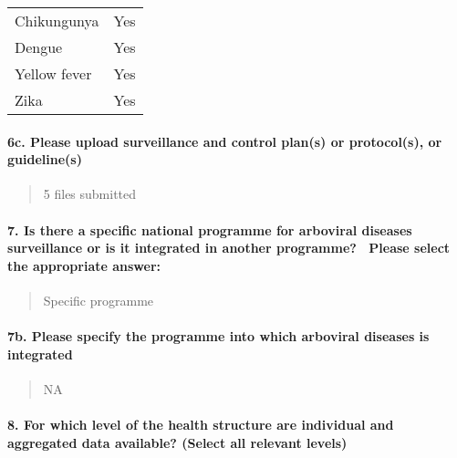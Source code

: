 \documentclass[
]{article}
\begin{document}
\begin{longtable}[]{@{}ll@{}}
\toprule
\endhead
Chikungunya & Yes \\
Dengue & Yes \\
Yellow fever & Yes \\
Zika & Yes \\
\bottomrule
\end{longtable}

\hypertarget{c.-please-upload-surveillance-and-control-plans-or-protocols-or-guidelines}{%
\paragraph{6c. Please upload surveillance and control plan(s) or
protocol(s), or
guideline(s)}\label{c.-please-upload-surveillance-and-control-plans-or-protocols-or-guidelines}}

\begin{quote}
5 files submitted
\end{quote}

\hypertarget{is-there-a-specific-national-programme-for-arboviral-diseases-surveillance-or-is-it-integrated-in-another-programme-please-select-the-appropriate-answer}{%
\paragraph{7. Is there a specific national programme for arboviral
diseases surveillance or is it integrated in another programme?~ Please
select the appropriate
answer:}\label{is-there-a-specific-national-programme-for-arboviral-diseases-surveillance-or-is-it-integrated-in-another-programme-please-select-the-appropriate-answer}}

\begin{quote}
Specific programme
\end{quote}

\hypertarget{b.-please-specify-the-programme-into-which-arboviral-diseases-is-integrated}{%
\paragraph{7b. Please specify the programme into which arboviral
diseases is
integrated}\label{b.-please-specify-the-programme-into-which-arboviral-diseases-is-integrated}}

\begin{quote}
NA
\end{quote}

\hypertarget{for-which-level-of-the-health-structure-are-individual-and-aggregated-data-available-select-all-relevant-levels}{%
\paragraph{8. For which level of the health structure are individual and
aggregated data available? (Select all relevant
levels)}\label{for-which-level-of-the-health-structure-are-individual-and-aggregated-data-available-select-all-relevant-levels}}
\end{document}
